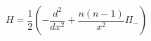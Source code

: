 \begin{equation}
H=\frac{1}{2}\left(-\frac{d^2}{dx^2}+\frac{n(n-1)}{x^2}\Pi_-
\right)
\label{hpi-}
\end{equation}

